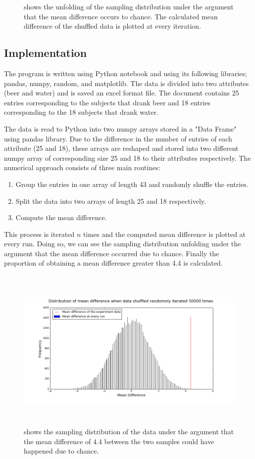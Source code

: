 \begin{figure}
\begin{tabular}{cc}
  \end{tabular}
  \caption{shows the unfolding of the sampling distribution under the argument that the mean difference occurs to chance. The calculated mean difference of the shuffled data is plotted at every iteration.}\label{unfold}
\end{figure}

\subsection{Implementation}
The program is written using Python notebook and using its following libraries; pandas, numpy, random, and matplotlib. The data is divided into two attributes (beer and water) and is saved an excel format file. The document contains 25 entries corresponding to the subjects that drank beer and 18  entries corresponding to the 18 subjects that drank water.

The data is read to Python into two numpy arrays stored in a "Data Frame" using pandas library. Due to the difference in the number of entries of each attribute (25 and 18), these arrays are reshaped and stored into two different numpy array of corresponding size 25 and 18 to their attributes respectively.
The numerical approach consists of three main routines:
\begin{enumerate}
  \item Group the entries in one array of length 43 and randomly shuffle the entries.
  \item Split the data into two arrays of length 25 and 18 respectively.
  \item Compute the mean difference.
\end{enumerate}
This process is iterated $n$ times and the computed mean difference is plotted at every run. Doing so, we can see the sampling distribution unfolding under the argument that the mean difference occurred due to chance. Finally the proportion of obtaining a mean difference greater than 4.4 is calculated.

\begin{figure}[t]
\centerline{\includegraphics[height=8cm,width=16cm]{./figures/distribution_50k}}
\caption{shows the sampling distribution of the data under the argument that the mean difference of 4.4 between the two samples could have happened due to chance. \label{histogram}}
\end{figure}

